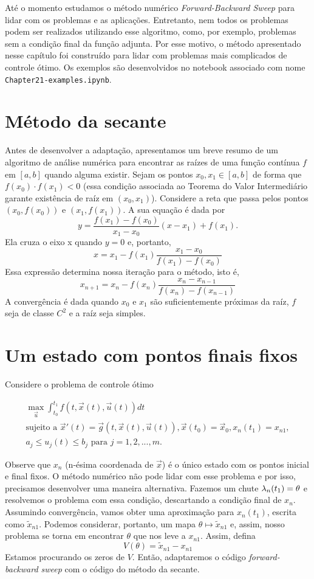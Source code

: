 Até o momento estudamos o método numérico \textit{Forward-Backward Sweep} para
lidar com os problemas e as aplicações. Entretanto, nem todos os problemas
podem ser realizados utilizando esse algoritmo, como, por exemplo, problemas
sem a condição final da função adjunta. Por esse motivo, o método apresentado
nesse capítulo foi construído para lidar com problemas mais complicados de
controle ótimo. Os exemplos são desenvolvidos no notebook associado com nome \texttt{Chapter21-examples.ipynb}. 

\section{Método da secante}

Antes de desenvolver a adaptação, apresentamos um breve resumo de um algoritmo
de análise numérica para encontrar as raízes de uma função 
contínua $f$ em $[a,b]$ quando alguma existir. Sejam os
pontos $x_0, x_1 \in [a,b]$ de forma que $f(x_0)\cdot f(x_1) < 0$ (essa
condição associada ao Teorema do Valor Intermediário garante existência de
raíz em $(x_0, x_1)$). Considere a reta
que passa pelos pontos $(x_0, f(x_0))$ e $(x_1, f(x_1))$. A sua equação é dada
por 
$$
y = \frac{f(x_1) - f(x_0)}{x_1 - x_0}(x - x_1) + f(x_1).
$$
Ela cruza o eixo x quando $y = 0$ e, portanto, 
$$
x = x_1 - f(x_1)\frac{x_1 - x_0}{f(x_1) - f(x_0)}
$$
Essa expressão determina nossa iteração para o método, isto é, 
$$
x_{n+1} = x_n - f(x_n)\frac{x_n - x_{n-1}}{f(x_n) - f(x_{n-1})}
$$
A convergência é dada quando $x_0$ e $x_1$ são suficientemente próximas da
raíz, $f$ seja de classe $C^2$ e a raíz seja simples. 

\section{Um estado com pontos finais fixos}

Considere o problema de controle ótimo 

\begin{gather*}
    \max_{\vec{u}} \int_{t_0}^{t_1} f(t, \vec{x}(t), \vec{u}(t)) dt \\ 
    \text{sujeito a   }\vec{x}'(t) = \vec{g}(t, \vec{x}(t), \vec{u}(t)),  
    \vec{x}(t_0) = \vec{x}_0, x_n(t_1) = x_{n1}, \\
    a_j \le u_j(t) \le b_j \text{ para }j = 1,2,...,m.
\end{gather*}

Observe que $x_n$ (n-ésima coordenada de $\vec{x}$) é o único estado com os pontos inicial e final fixos. O
método numérico não pode lidar com esse problema e por isso, precisamos
desenvolver uma maneira alternativa. Fazemos um chute $\lambda_n(t_1) = \theta$ e
resolvemos o problema com essa condição, descartando a condição final de $x_n$. Assumindo convergência, vamos obter
uma aproximação para $x_n(t_1)$, escrita como $\tilde{x}_{n1}$. Podemos
considerar, portanto, um mapa $\theta \mapsto \tilde{x}_{n1}$ e, assim, nosso problema se torna em encontrar $\theta$ que
nos leve a $x_{n1}$. Assim, defina 
$$
V(\theta) = \tilde{x}_{n1} - x_{n1} 
$$
Estamos procurando os zeros de $V$. Então, adaptaremos o código
\textit{forward-backward sweep} com o código do método da secante. 

